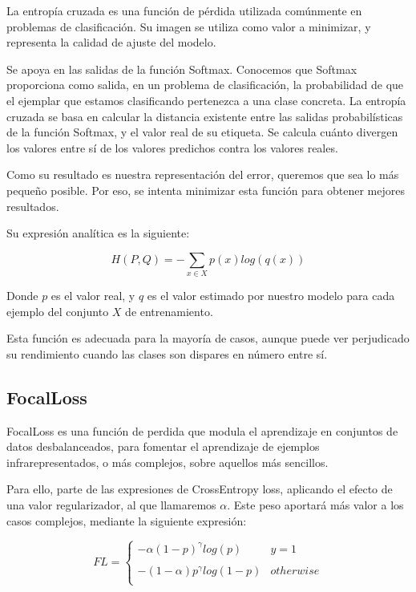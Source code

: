 La entropía cruzada es una función de pérdida utilizada comúnmente en problemas de clasificación. Su imagen se utiliza como valor a minimizar, y representa la calidad de ajuste del modelo.

Se apoya en las salidas de la función Softmax. Conocemos que Softmax proporciona como salida, en un problema de clasificación, la probabilidad de que el ejemplar que estamos clasificando pertenezca a una clase concreta. La entropía cruzada se basa en calcular la distancia existente entre las salidas probabilísticas de la función Softmax, y el valor real de su etiqueta. Se calcula cuánto divergen los valores entre sí de los valores predichos contra los valores reales.

Como su resultado es nuestra representación del error, queremos que sea lo más pequeño posible. Por eso, se intenta minimizar esta función para obtener mejores resultados.

Su expresión analítica es la siguiente:

$$H(P,Q)= -\sum_{x \in X}p(x)log(q(x))$$

Donde $p$ es el valor real, y $q$ es el valor estimado por nuestro modelo para cada ejemplo del conjunto $X$ de entrenamiento.

Esta función es adecuada para la mayoría de casos, aunque puede ver perjudicado su rendimiento cuando las clases son dispares en número entre sí.

\subsection{FocalLoss}

FocalLoss \cite{lin2018focal} es una función de perdida que modula el aprendizaje en conjuntos de datos desbalanceados, para fomentar el aprendizaje de ejemplos infrarepresentados, o más complejos, sobre aquellos más sencillos.

Para ello, parte de las expresiones de CrossEntropy loss, aplicando el efecto de una valor regularizador, al que llamaremos $\alpha$. Este peso aportará más valor a los casos complejos, mediante la siguiente expresión:

$$FL = \left\{ \begin{array}{lcc} -\alpha(1-p)^{\gamma}log(p)& y = 1 \\ 
	\\  -(1-\alpha)p^{\gamma}log(1-p) & otherwise  \\ \end{array} \right.$$

